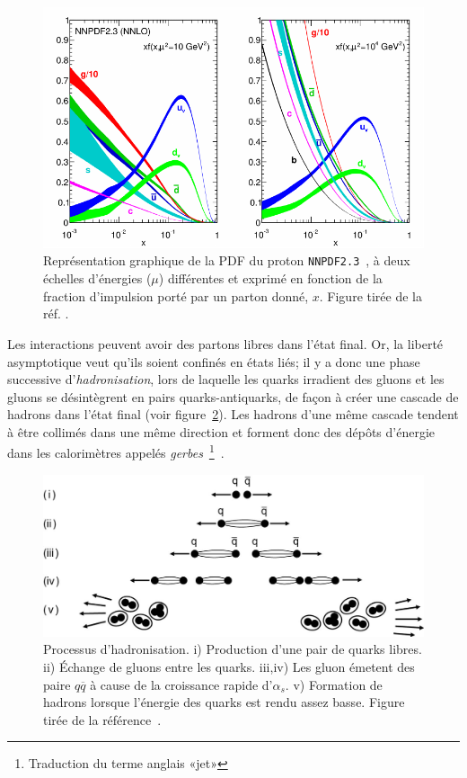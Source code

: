 \begin{figure}
  \centering
  \includegraphics{nnpdf23.pdf}
  \caption{Représentation graphique de la PDF du proton
    \texttt{NNPDF2.3}~\cite{ball_parton_2013}, à deux échelles
    d'énergies ($\mu$) différentes et exprimé en fonction de la
    fraction d'impulsion porté par un parton donné, $x$. Figure tirée de la
    réf. \cite{olive_qcd_2014}.}
  \label{fig:pdf}
\end{figure}

Les interactions peuvent avoir des partons libres dans l'état
final. Or, la liberté asymptotique veut qu'ils soient confinés en
états liés; il y a donc une phase successive d'\emph{hadronisation},
lors de laquelle les quarks irradient des gluons et les gluons se
désintègrent en pairs quarks-antiquarks, de façon à créer une cascade
de hadrons dans l'état final (voir
figure~\ref{fig:hadronisation}). Les hadrons d'une même cascade
tendent à être collimés dans une même direction et forment donc des
dépôts d'énergie dans les calorimètres appelés
\emph{gerbes}~\footnote{Traduction du terme anglais
  «jet»}~\cite{thomson_modern_2013}.

\begin{figure}
  \centering
  \includegraphics{hadronisation.jpg}
  \caption{Processus d'hadronisation. i) Production d'une pair de
    quarks libres. ii) Échange de gluons entre les quarks. iii,iv) Les
    gluon émetent des paire $q\overline{q}$ à cause de la croissance
    rapide d'$\alpha_s$. v) Formation de hadrons lorsque l'énergie des
    quarks est rendu assez basse. Figure tirée de la
    référence~\cite{thomson_modern_2013}.}
  \label{fig:hadronisation}
\end{figure}

